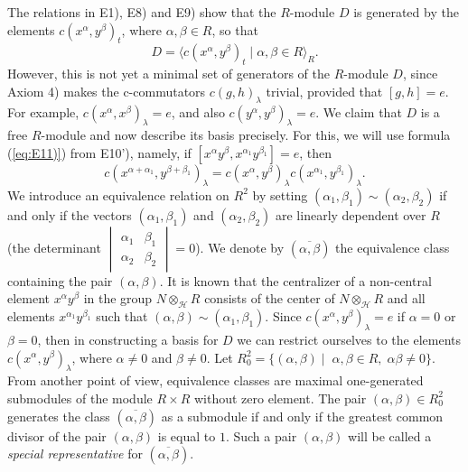 \documentclass[11pt]{article}
\theoremstyle{definition}
\begin{document}
The relations in E1), E8) and E9) show that the $R$-module $D$ is generated by the elements $c(x^\alpha,y^\beta)_t$, where $\alpha, \beta \in R$, so that 
\begin{equation} \label{eq:gensD}
    D = \langle c(x^\alpha,y^\beta)_t \mid \alpha, \beta \in R\rangle_R.
\end{equation}
However, this is not yet a minimal set of generators of the $R$-module $D$, since Axiom 4) makes the c-commutators $c(g,h)_\lambda$ trivial, provided that $[g,h] = e$. For example, $c(x^\alpha,x^\beta)_\lambda = e$, and also $c(y^\alpha,y^\beta)_\lambda = e$. We claim that $D$ is a free $R$-module and now describe its basis precisely. For this, we will use formula (\ref{eq:E11)}) from E10'), namely, if $[x^\alpha y^\beta,x^{\alpha_1} y^{\beta_1}] =e$, then
\begin{equation} \label{eq:additive}
c(x^{\alpha+\alpha_1},y^{\beta+\beta_1})_\lambda = c(x^{\alpha},y^{\beta})_\lambda c(x^{\alpha_1},y^{\beta_1})_\lambda.
\end{equation}
 We introduce an equivalence relation on $R^2$ by setting $(\alpha_1,\beta_1)\sim (\alpha_2,\beta_2)$ if and only if the vectors $(\alpha_1,\beta_1)$ and $(\alpha_2,\beta_2)$ are linearly dependent over $R$ (the determinant $\begin{vmatrix} \alpha_1 & \beta_1 \\ \alpha_2 & \beta_2 \end{vmatrix}=0$). We denote by $(\overline{\alpha,\beta})$ the equivalence class containing the pair $(\alpha,\beta)$. It is known that the centralizer of a non-central element $x^\alpha y^\beta$ in the group $N\otimes_{\mathcal{H}} R$ consists of the center of $N\otimes_{\mathcal{H}} R$ and all elements $x^{\alpha_1} y^{\beta_1}$ such that $(\alpha,\beta) \sim (\alpha_1,\beta_1)$.
Since $c(x^\alpha,y^\beta)_\lambda = e$ if $\alpha = 0$ or $\beta =0$, then in constructing a basis for $D$ we can restrict ourselves to the elements $c(x^\alpha,y^\beta)_\lambda$, where $\alpha \neq 0$ and $\beta \neq 0$. Let $R_0^2=\{(\alpha,\beta)\mid\;\alpha,\beta\in R,\;\alpha\beta\neq 0\}$. From another point of view, equivalence classes are maximal one-generated submodules of the module $R \times R$ without zero element. The pair $(\alpha,\beta) \in R_0^2$ generates the class $(\overline{\alpha,\beta})$ as a submodule if and only if the greatest common divisor of the pair $(\alpha,\beta)$ is equal to $1$. Such a pair $(\alpha,\beta)$ will be called a \emph{special representative} for $(\overline{\alpha,\beta})$.
\end{document}
